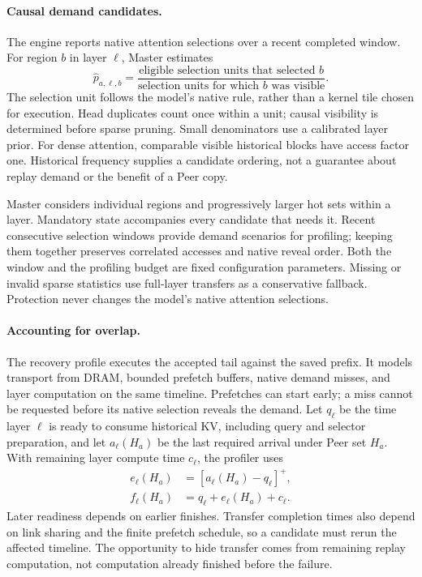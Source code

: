 \paragraph{Causal demand candidates.}
The engine reports native attention selections over a recent completed
window. For region $b$ in layer $\ell$, Master estimates
\begin{equation}
 \widehat p_{a,\ell,b}=
 \frac{\text{eligible selection units that selected }b}
      {\text{selection units for which }b\text{ was visible}}.
 \label{eq:teacher-demand}
\end{equation}
The selection unit follows the model's native rule, rather than a
kernel tile chosen for execution. Head duplicates count once within a
unit; causal visibility is determined before sparse pruning. Small
denominators use a calibrated layer prior. For dense attention,
comparable visible historical blocks have access factor one.
Historical frequency supplies a candidate ordering, not a guarantee
about replay demand or the benefit of a Peer copy.

Master considers individual regions and progressively larger hot sets
within a layer. Mandatory state accompanies every candidate that needs
it. Recent consecutive selection windows provide demand scenarios for
profiling; keeping them together preserves correlated accesses and
native reveal order. Both the window and the profiling budget are fixed
configuration parameters. Missing or invalid sparse statistics use
full-layer transfers as a conservative fallback. Protection never
changes the model's native attention selections.

\paragraph{Accounting for overlap.}
The recovery profile executes the accepted tail against the saved
prefix. It models transport from DRAM, bounded prefetch buffers, native
demand misses, and layer computation on the same timeline. Prefetches
can start early; a miss cannot be requested before its native selection
reveals the demand. Let $q_\ell$ be the time layer $\ell$ is ready to
consume historical KV, including query and selector preparation, and
let $a_\ell(H_a)$ be the last required arrival under Peer set $H_a$.
With remaining layer compute time $c_\ell$, the profiler uses
\begin{equation}
 \begin{aligned}
 e_\ell(H_a)&=[a_\ell(H_a)-q_\ell]^+,\\
 f_\ell(H_a)&=q_\ell+e_\ell(H_a)+c_\ell.
 \end{aligned}
 \label{eq:teacher-overlap}
\end{equation}
Later readiness depends on earlier finishes. Transfer completion times
also depend on link sharing and the finite prefetch schedule, so a
candidate must rerun the affected timeline. The opportunity to hide
transfer comes from remaining replay computation, not computation
already finished before the failure.


